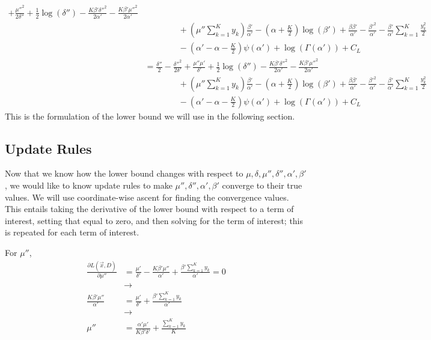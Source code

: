 \documentclass[12pt]{article}
\begin{document}
\begin{appendices}
\begin{align}
    + \frac{\mu''^{2}}{2\delta''} + \frac{1}{2}\log{(\delta'')}
    -\frac{K\beta'\delta''^2}{2\alpha'}
    - \frac{K\beta'\mu''^{2}}{2\alpha'}
    \nonumber \\
    &\quad\quad\quad\quad
    +(\mu''\sum_{k=1}^{K}y_{k})\frac{\beta'}{\alpha'}
    - (\alpha+\frac{K}{2})\log(\beta')
    + \frac{\beta\beta'}{\alpha'}-\frac{\beta'^2}{\alpha'}-\frac{\beta'}{\alpha'}\sum_{k=1}^{K}\frac{y_{k}^2}{2}
    \nonumber \\
    &\quad\quad\quad\quad
    -(\alpha'-\alpha-\frac{K}{2})\psi(\alpha')
    + \log{(\Gamma(\alpha'))}
    + C_L
    \nonumber \\
    &=
    \frac{\delta''}{2}-\frac{\delta''^2}{2\delta'}
    + \frac{\mu''\mu'}{\delta'}
    + \frac{1}{2}\log{(\delta'')}
    -\frac{K\beta'\delta''^2}{2\alpha'}
    - \frac{K\beta'\mu''^{2}}{2\alpha'}
    \nonumber \\
    &\quad\quad\quad\quad
    +(\mu''\sum_{k=1}^{K}y_{k})\frac{\beta'}{\alpha'}
    - (\alpha+\frac{K}{2})\log(\beta')
    + \frac{\beta\beta'}{\alpha'}-\frac{\beta'^2}{\alpha'}-\frac{\beta'}{\alpha'}\sum_{k=1}^{K}\frac{y_{k}^2}{2}
    \nonumber \\
    &\quad\quad\quad\quad
    -(\alpha'-\alpha-\frac{K}{2})\psi(\alpha')
    + \log{(\Gamma(\alpha'))}
    + C_L
\end{align}
This is the formulation of the lower bound we will use in the following section.

\subsection{Update Rules}

Now that we know how the lower bound changes with respect to $\mu, \delta,
\mu'', \delta'', \alpha', \beta'$, we would like to know update rules to make
$\mu'', \delta'', \alpha', \beta'$ converge to their true values.  We will use
coordinate-wise ascent for finding the convergence values.  This entails taking
the derivative of the lower bound with respect to a term of interest, setting
that equal to zero, and then solving for the term of interest; this is repeated
for each term of interest.

For $\mu''$,
\begin{align}
    \frac{\partial L(\vec{x}, D)}{\partial \mu''} &=
    \frac{\mu'}{\delta'}
    - \frac{K\beta'\mu''}{\alpha'} + \frac{\beta'\sum_{k=1}^{K}y_{k}}{\alpha'}
    = 0
    \nonumber \\
    &\rightarrow
    \nonumber \\
    \frac{K\beta'\mu''}{\alpha'} &= \frac{\mu'}{\delta'}
    + \frac{\beta'\sum_{k=1}^{K}y_{k}}{\alpha'}
    \nonumber \\
    &\rightarrow
    \nonumber \\
    \mu'' &= \frac{\alpha'\mu'}{K\beta'\delta'}
    + \frac{\sum_{k=1}^{K}y_{k}}{K}
\end{align}


\end{appendices}
\end{document}
